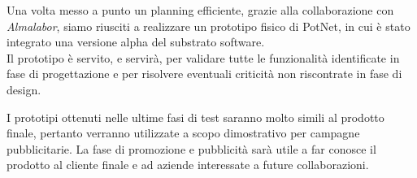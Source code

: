 Una volta messo a punto un planning efficiente, grazie alla collaborazione con \textit{Almalabor}, siamo riusciti a realizzare un prototipo fisico di PotNet, in cui è stato integrato una versione alpha del substrato software.\\Il prototipo è servito, e servirà, per validare tutte le funzionalità identificate in fase di progettazione e per risolvere eventuali criticità non riscontrate in fase di design.

I prototipi ottenuti nelle ultime fasi di test saranno molto simili al prodotto finale, pertanto verranno utilizzate a scopo dimostrativo per campagne pubblicitarie. La fase di promozione e pubblicità sarà utile a far conosce il prodotto al cliente finale e ad aziende interessate a future collaborazioni.
